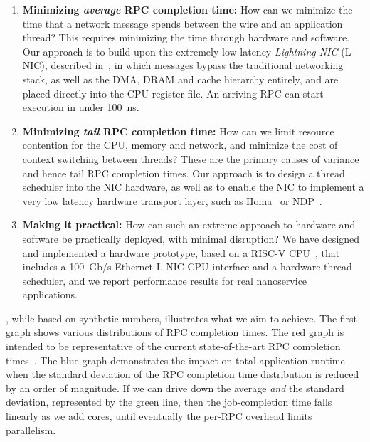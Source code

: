 \begin{enumerate}[topsep=0.4\baselineskip, leftmargin=20pt]
    \item {\bf Minimizing {\em average} RPC completion time:} How can we minimize the time that a network message spends between the wire and an application thread?
    This requires minimizing the time through hardware and software. Our approach is to build upon the extremely low-latency {\em Lightning NIC} (L-NIC), described in~\cite{lnic}, in which messages bypass the traditional networking stack, as well as the DMA, DRAM and cache hierarchy entirely, and are placed directly into the CPU register file.
    An arriving RPC can start execution in under \SI{100}{ns}. 
    \item {\bf Minimizing {\em tail} RPC completion time:} How can we limit resource contention for the CPU, memory and network, and minimize the cost of context switching between threads?
    These are the primary causes of variance and hence tail RPC completion times.
    Our approach is to design a thread scheduler into the NIC hardware, as well as to enable the NIC to implement a very low latency hardware transport layer, such as Homa~\cite{homa} or NDP~\cite{ndp}.
    \item {\bf Making it practical:} How can such an extreme approach to hardware and software be practically deployed, with minimal disruption? 
    We have designed and implemented a hardware prototype, based on a RISC-V CPU~\cite{rocket-chip}, that includes a \SI{100}{Gb/s} Ethernet L-NIC CPU interface and a hardware thread scheduler, and we report performance results for real nanoservice applications.
\end{enumerate}

, while based on synthetic numbers, illustrates what we aim to achieve.
The first graph shows various distributions of RPC completion times. 
The red graph is intended to be representative of the current state-of-the-art RPC completion times~\cite{eRPC}. The blue graph demonstrates the impact on total application runtime when the standard deviation of the RPC completion time distribution is reduced by an order of magnitude.
If we can drive down the average {\em and} the standard deviation, represented by the green line, then the job-completion time falls linearly as we add cores, until eventually the per-RPC overhead limits parallelism. 

